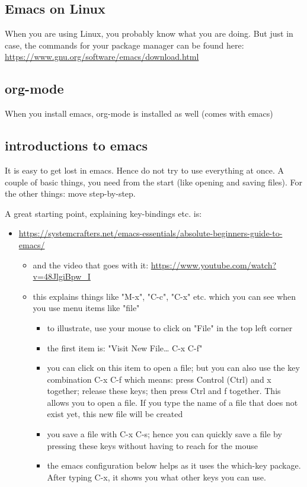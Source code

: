 \documentclass[11pt]{article}
\begin{document}
\subsection{Emacs on Linux}
\label{sec:org3ddf458}

When you are using Linux, you probably know what you are doing. But just in case, the commands for your package manager can be found here: \url{https://www.gnu.org/software/emacs/download.html}



\subsection{org-mode}
\label{sec:org903ce05}

When you install emacs, org-mode is installed as well (comes with emacs)


\subsection{introductions to emacs}
\label{sec:orgae425b7}

It is easy to get lost in emacs. Hence do not try to use everything at once. A couple of basic things, you need from the start (like opening and saving files). For the other things: move step-by-step. 

A great starting point, explaining key-bindings etc. is:
\begin{itemize}
\item \url{https://systemcrafters.net/emacs-essentials/absolute-beginners-guide-to-emacs/}
\begin{itemize}
\item and the video that goes with it: \url{https://www.youtube.com/watch?v=48JlgiBpw\_I}
\item this explains things like "M-x", "C-c", "C-x" etc. which you can see when you use menu items like "file"
\begin{itemize}
\item to illustrate, use your mouse to click on "File" in the top left corner
\item the first item is: "Visit New File\ldots{} C-x C-f"
\item you can click on this item to open a file; but you can also use the key combination C-x C-f which means: press Control (Ctrl) and x together; release these keys; then press Ctrl and f together. This allows you to open a file. If you type the name of a file that does not exist yet, this new file will be created
\item you save a file with C-x C-s; hence you can quickly save a file by pressing these keys without having to reach for the mouse
\item the emacs configuration below helps as it uses the which-key package. After typing C-x, it shows you what other keys you can use.
\end{itemize}
\end{itemize}
\end{itemize}
\end{document}
